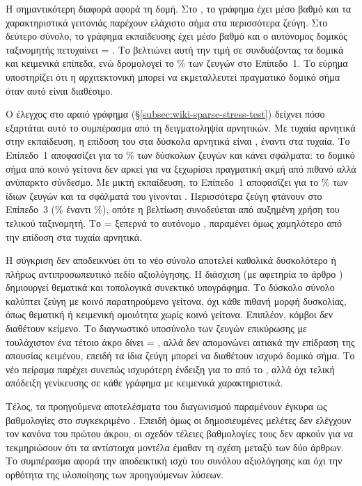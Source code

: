 Η σημαντικότερη διαφορά αφορά τη δομή.
Στο , το γράφημα έχει
μέσο βαθμό \GraphMeanDegree{} και τα χαρακτηριστικά γειτονιάς παρέχουν ελάχιστο
σήμα στα περισσότερα ζεύγη.
Στο δεύτερο σύνολο, το γράφημα εκπαίδευσης έχει
μέσο βαθμό \WfMeanDegree{} και ο αυτόνομος δομικός ταξινομητής πετυχαίνει
 = \WfStructuralFone{}.
Το  βελτιώνει αυτή την τιμή
σε \WfCascadeFone{} συνδυάζοντας τα δομικά και κειμενικά επίπεδα, ενώ
δρομολογεί το \WfTierOnePct\% των ζευγών στο Επίπεδο~1.
Το εύρημα υποστηρίζει
ότι η αρχιτεκτονική μπορεί να εκμεταλλευτεί πραγματικό δομικό σήμα όταν αυτό
είναι διαθέσιμο.

Ο έλεγχος στο αραιό γράφημα (\S\ref{subsec:wiki-sparse-stress-test}) δείχνει
πόσο εξαρτάται αυτό το συμπέρασμα από τη δειγματοληψία αρνητικών.
Με τυχαία αρνητικά στην εκπαίδευση, η επίδοση του  στα δύσκολα
αρνητικά είναι \WsRandomHardCascadeFone{}, έναντι
\WsRandomRandomCascadeFone{} στα τυχαία. Το Επίπεδο~1 αποφασίζει για το
\WsRandomHardTierOnePct\% των δύσκολων ζευγών και κάνει
\WsRandomHardTierOneErrors{} σφάλματα: το δομικό σήμα από κοινό γείτονα
δεν αρκεί για να ξεχωρίσει πραγματική ακμή από πιθανό αλλά ανύπαρκτο σύνδεσμο.
Με μικτή εκπαίδευση, το Επίπεδο~1 αποφασίζει για το
\WsMixedHardTierOnePct\% των ίδιων ζευγών και τα σφάλματά του γίνονται
\WsMixedHardTierOneErrors{}. Περισσότερα ζεύγη φτάνουν στο Επίπεδο~3
(\WsMixedHardTierThreePct\% έναντι \WsRandomHardTierThreePct\%), οπότε η
βελτίωση συνοδεύεται από αυξημένη χρήση του τελικού ταξινομητή.
Το  = \WsMixedHardCascadeFone{} ξεπερνά το αυτόνομο
, παραμένει όμως χαμηλότερο από την επίδοση στα τυχαία
αρνητικά.

Η σύγκριση δεν αποδεικνύει ότι το νέο σύνολο αποτελεί καθολικά δυσκολότερο ή
πλήρως αντιπροσωπευτικό πεδίο αξιολόγησης.
Η διάσχιση  (με αφετηρία το άρθρο ) δημιουργεί
θεματικά και τοπολογικά συνεκτικό υπογράφημα. Το δύσκολο σύνολο καλύπτει
ζεύγη με κοινό παρατηρούμενο γείτονα, όχι κάθε πιθανή μορφή δυσκολίας, όπως
θεματική ή κειμενική ομοιότητα χωρίς κοινό γείτονα.
Επιπλέον, \WfTextEmptyN{} κόμβοι δεν διαθέτουν
κείμενο.
Το διαγνωστικό υποσύνολο των \WfMissingTextCount{} ζευγών επικύρωσης με
τουλάχιστον ένα τέτοιο άκρο δίνει  = \WfMissingTextFone{}, αλλά δεν
απομονώνει αιτιακά την επίδραση της απουσίας κειμένου, επειδή τα ίδια ζεύγη μπορεί
να διαθέτουν ισχυρό δομικό σήμα.
Το νέο
πείραμα παρέχει συνεπώς ισχυρότερη ένδειξη για το  από το
, αλλά όχι τελική απόδειξη γενίκευσης σε κάθε γράφημα με
κειμενικά χαρακτηριστικά.

Τέλος, τα προηγούμενα αποτελέσματα του διαγωνισμού  παραμένουν
έγκυρα ως βαθμολογίες στο συγκεκριμένο .
Επειδή όμως οι
δημοσιευμένες μελέτες δεν ελέγχουν τον κανόνα του πρώτου άκρου, οι σχεδόν
τέλειες βαθμολογίες τους δεν αρκούν για να τεκμηριώσουν ότι τα αντίστοιχα
μοντέλα έμαθαν τη σχέση μεταξύ των δύο άρθρων.
Το συμπέρασμα αφορά την
αποδεικτική ισχύ του συνόλου αξιολόγησης και όχι την ορθότητα της υλοποίησης
των προηγούμενων λύσεων.
